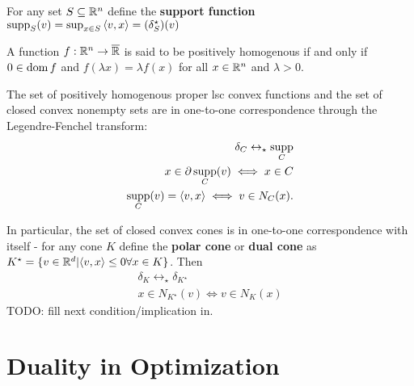 \begin{defn}
  \label{sec:conjugate-functions-12}
  For any set $S \subseteq \mathbb{R}^{n}$ define the \textbf{support
    function} $\supp_{S}(v) = \sup_{x \in S} \IP{v, x} = (\delta^{\star}_{S})(v)$
\end{defn}

\begin{defn}
  \label{sec:conjugate-functions-13}
  A function $f: \mathbb{R}^{n} \rightarrow \overline {\mathbb{R}}$ is said to be
  positively homogenous if and only if $0 \in \operatorname*{dom} f$ and $f(\lambda
  x) = \lambda f(x)$ for all $x \in \mathbb{R}^{n}$ and $\lambda > 0$.
\end{defn}

\begin{thm}
  \label{sec:conjugate-functions-14}
  The set of positively homogenous proper lsc convex functions and the
  set of closed convex nonempty sets are in one-to-one correspondence
  through the Legendre-Fenchel transform:
  \begin{align}
    \label{eq:28}
    \delta_{C} \leftrightarrow_{\star} \supp_{C} \\
    \label{eq:29}
    x \in \partial \supp_{C}(v) \iff x \in C \\
    \label{eq:30}
    \supp_{C}(v) = \IP{v, x} \iff v \in N_{C}(x).
  \end{align}

  In particular, the set of closed convex cones is in one-to-one
  correspondence with itself - for any cone $K$ define the
  \textbf{polar cone} or \textbf{dual cone} as $K^{\star} = \{ v \in
  \R^{d} | \IP{v, x} \leq 0 \forall x \in K \} $.  Then
  \begin{align}
    \label{eq:31}
    \delta_{K} \leftrightarrow_{\star} \delta_{K^{\star}} \\
    \label{eq:32}
    x \in N_{K^{\star}}(v) \iff v \in N_{K}(x) %
  \end{align}
  TODO: fill next condition/implication in.
\end{thm}

\section{Duality in Optimization}
\label{sec:duality-optimization}

